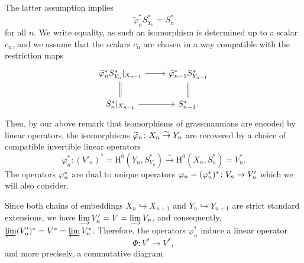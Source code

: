 \documentclass[11pt, a4paper]{article}
\begin{document}
The latter assumption implies \begin{equation}\label{formula:image_of_sheaf}
    \widetilde{\varphi}^*_n S^*_{Y_n}= S^*_n
\end{equation}
for all $n$. We write equality, as such an isomorphism is determined up to a scalar $c_n$, and we assume that the scalars $c_n$ are chosen in a way compatible with the restriction
maps
\begin{equation*}%
    \begin{tikzcd}
\widetilde{\varphi}^*_n S^*_{Y_n}|_{X_{n-1}} \arrow[d,equal] \arrow{r}
& \widetilde{\varphi}^*_{n-1}S^*_{Y_{n-1}} \arrow[d,equal] \\
S^*_n|_{X_{n-1}} \arrow{r}
& S^*_{n-1}.
\end{tikzcd}
\end{equation*}
Then, by our above remark that isomorphisms of grassmannians are encoded by linear operators, the isomorphisms $\widetilde{\varphi}_n\colon X_n\stackrel{\sim}{\rightarrow} Y_n$ are recovered by a choice of compatible invertible linear operators \begin{equation*}
    \varphi^*_n\colon (V'_n)^*=\mathrm{H}^0(Y_n,S^*_{Y_n})\stackrel{\sim}{\rightarrow} \mathrm{H}^0(X_n,S^*_n)=V^*_n. 
\end{equation*}
The operators $\varphi^*_n$ are dual to unique operators $\varphi_n=(\varphi^*_n)^*\colon V_n \rightarrow V'_n$ which we will also consider.

Since both chains of embeddings $X_n\hookrightarrow X_{n+1}$ and $Y_n\hookrightarrow Y_{n+1}$ are strict standard extensions, we have $\varinjlim V'_n=V=\varinjlim V_n$, and consequently, $\varprojlim (V'_n)^*=V^*=\varprojlim V^*_n$. Therefore, the operators $\varphi^*_n$ induce a linear operator \begin{equation*}
    \Phi\colon V^*\rightarrow V^*,
\end{equation*}
and more precisely, a commutative diagram


\end{document}
